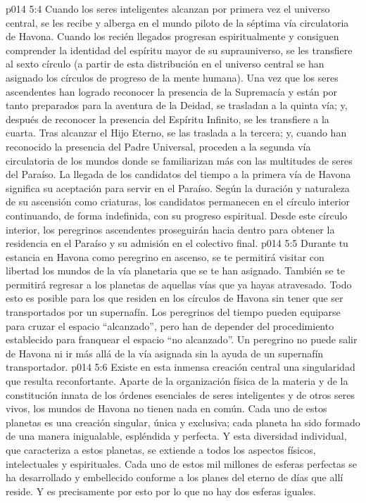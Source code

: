 \vs p014 5:4 \pc Cuando los seres inteligentes alcanzan por primera vez el universo central, se les recibe y alberga en el mundo piloto de la séptima vía circulatoria de Havona. Cuando los recién llegados progresan espiritualmente y consiguen comprender la identidad del espíritu mayor de su suprauniverso, se les transfiere al sexto círculo (a partir de esta distribución en el universo central se han asignado los círculos de progreso de la mente humana). Una vez que los seres ascendentes han logrado reconocer la presencia de la Supremacía y están por tanto preparados para la aventura de la Deidad, se trasladan a la quinta vía; y, después de reconocer la presencia del Espíritu Infinito, se les transfiere a la cuarta. Tras alcanzar el Hijo Eterno, se las traslada a la tercera; y, cuando han reconocido la presencia del Padre Universal, proceden a la segunda vía circulatoria de los mundos donde se familiarizan más con las multitudes de seres del Paraíso. La llegada de los candidatos del tiempo a la primera vía de Havona significa su aceptación para servir en el Paraíso. Según la duración y naturaleza de su ascensión como criaturas, los candidatos permanecen en el círculo interior continuando, de forma indefinida, con su progreso espiritual. Desde este círculo interior, los peregrinos ascendentes proseguirán hacia dentro para obtener la residencia en el Paraíso y su admisión en el colectivo final.
\vs p014 5:5 Durante tu estancia en Havona como peregrino en ascenso, se te permitirá visitar con libertad los mundos de la vía planetaria que se te han asignado. También se te permitirá regresar a los planetas de aquellas vías que ya hayas atravesado. Todo esto es posible para los que residen en los círculos de Havona sin tener que ser transportados por un supernafín. Los peregrinos del tiempo pueden equiparse para cruzar el espacio “alcanzado”, pero han de depender del procedimiento establecido para franquear el espacio “no alcanzado”. Un peregrino no puede salir de Havona ni ir más allá de la vía asignada sin la ayuda de un supernafín transportador.
\vs p014 5:6 \pc Existe en esta inmensa creación central una singularidad que resulta reconfortante. Aparte de la organización física de la materia y de la constitución innata de los órdenes esenciales de seres inteligentes y de otros seres vivos, los mundos de Havona no tienen nada en común. Cada uno de estos planetas es una creación singular, única y exclusiva; cada planeta ha sido formado de una manera inigualable, espléndida y perfecta. Y esta diversidad individual, que caracteriza a estos planetas, se extiende a todos los aspectos físicos, intelectuales y espirituales. Cada uno de estos mil millones de esferas perfectas se ha desarrollado y embellecido conforme a los planes del eterno de días que allí reside. Y es precisamente por esto por lo que no hay dos esferas iguales.
